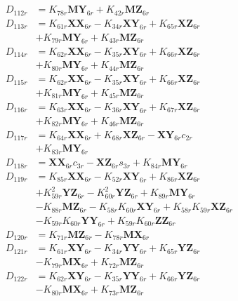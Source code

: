 \begin{align}
 \nonumber \\ 
D_{112r} &= K_{78r}\mathbf{MY}_{6r} + K_{42r}\mathbf{MZ}_{6r} \nonumber \\
D_{113r} &= K_{61r}\mathbf{XX}_{6r} - K_{34r}\mathbf{XY}_{6r} + K_{65r}\mathbf{XZ}_{6r}  \nonumber \\
&+ K_{79r}\mathbf{MY}_{6r} + K_{43r}\mathbf{MZ}_{6r} \nonumber \\
D_{114r} &= K_{62r}\mathbf{XX}_{6r} - K_{35r}\mathbf{XY}_{6r} + K_{66r}\mathbf{XZ}_{6r}  \nonumber \\
&+ K_{80r}\mathbf{MY}_{6r} + K_{44r}\mathbf{MZ}_{6r} \nonumber \\
D_{115r} &= K_{62r}\mathbf{XX}_{6r} - K_{35r}\mathbf{XY}_{6r} + K_{66r}\mathbf{XZ}_{6r}  \nonumber \\
&+ K_{81r}\mathbf{MY}_{6r} + K_{45r}\mathbf{MZ}_{6r} \nonumber \\
D_{116r} &= K_{63r}\mathbf{XX}_{6r} - K_{36r}\mathbf{XY}_{6r} + K_{67r}\mathbf{XZ}_{6r}  \nonumber \\
&+ K_{82r}\mathbf{MY}_{6r} + K_{46r}\mathbf{MZ}_{6r} \nonumber \\
D_{117r} &= K_{64r}\mathbf{XX}_{6r} + K_{68r}\mathbf{XZ}_{6r} - \mathbf{XY}_{6r}c_{2r}  \nonumber \\
&+ K_{83r}\mathbf{MY}_{6r} \nonumber \\
D_{118r} &= \mathbf{XX}_{6r}c_{3r} - \mathbf{XZ}_{6r}s_{3r} + K_{84r}\mathbf{MY}_{6r} \nonumber \\
D_{119r} &= K_{85r}\mathbf{XX}_{6r} - K_{52r}\mathbf{XY}_{6r} + K_{86r}\mathbf{XZ}_{6r}  \nonumber \\
&+ K_{59r}^2\mathbf{YZ}_{6r} - K_{60r}^2\mathbf{YZ}_{6r} + K_{89r}\mathbf{MY}_{6r}  \nonumber \\
&- K_{88r}\mathbf{MZ}_{6r} - K_{58r}K_{60r}\mathbf{XY}_{6r} + K_{58r}K_{59r}\mathbf{XZ}_{6r}  \nonumber \\
&- K_{59r}K_{60r}\mathbf{YY}_{6r} + K_{59r}K_{60r}\mathbf{ZZ}_{6r} \nonumber \\
D_{120r} &= K_{71r}\mathbf{MZ}_{6r} - K_{78r}\mathbf{MX}_{6r} \nonumber \\
D_{121r} &= K_{61r}\mathbf{XY}_{6r} - K_{34r}\mathbf{YY}_{6r} + K_{65r}\mathbf{YZ}_{6r}  \nonumber \\
&- K_{79r}\mathbf{MX}_{6r} + K_{72r}\mathbf{MZ}_{6r} \nonumber \\
D_{122r} &= K_{62r}\mathbf{XY}_{6r} - K_{35r}\mathbf{YY}_{6r} + K_{66r}\mathbf{YZ}_{6r}  \nonumber \\
&- K_{80r}\mathbf{MX}_{6r} + K_{73r}\mathbf{MZ}_{6r} \nonumber \\

\end{align}

